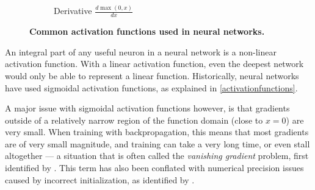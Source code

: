 \documentclass[thesis]{subfiles}
\begin{document}
\begin{figure}[tbp]
\begin{subfigure}[t]{0.48\textwidth}
		\caption{Derivative $\frac{d \max(0,x)}{dx}$}\label{fig:relugradient}
	\end{subfigure}
	\caption[Activation functions]{\textbf{Common activation functions used in neural networks.}}\label{fig:afunctions}
\end{figure}

An integral part of any useful neuron in a neural network is a non-linear activation function. With a linear activation function, even the deepest network would only be able to represent a linear function. Historically, neural networks have used sigmoidal activation functions, as explained in \cref{activationfunctions}.

A major issue with sigmoidal activation functions however, is that gradients outside of a relatively narrow region of the function domain (close to $x=0$) are very small. When training with backpropagation, this means that most gradients are of very small magnitude, and training can take a very long time, or even stall altogether --- a situation that is often called the \emph{vanishing gradient} problem, first identified by \citet{hochreiter1991untersuchungen}. This term has also been conflated with numerical precision issues caused by incorrect initialization, as identified by \citet{glorot2010understanding}.
\end{document}
